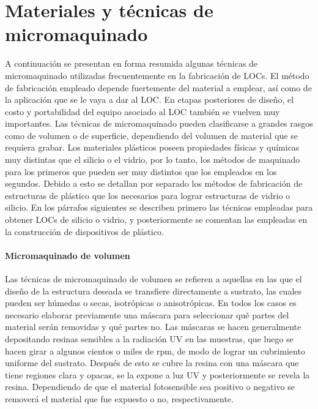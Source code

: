 \documentclass[a4paper, 12pt]{article}
\begin{document}
\section{Materiales y técnicas de micromaquinado}\label{S:mat}
A continuación se presentan en forma resumida algunas técnicas de micromaquinado utilizadas frecuentemente en la fabricación de LOCs. El método de fabricación empleado depende fuertemente del material a emplear, así como de la aplicación que se le vaya a dar al LOC. En etapas posteriores de diseño, el costo y portabilidad del equipo asociado al LOC también se vuelven muy importantes. Las técnicas de micromaquinado pueden clasificarse a grandes rasgos como de volumen o de superficie, dependiendo del volumen de material que se requiera grabar. Los materiales plásticos poseen propiedades físicas y químicas muy distintas que el silicio o el vidrio, por lo tanto, los métodos de maquinado para los primeros que pueden ser muy distintos que los empleados en los segundos. Debido a esto se detallan por separado los métodos de fabricación de estructuras de plástico que los necesarios para lograr estructuras de vidrio o silicio. En los párrafos siguientes se describen primero las técnicas empleadas para obtener LOCs de silicio o vidrio, y posteriormente se comentan las empleadas en la construcción de dispositivos de plástico.


\paragraph*{Micromaquinado de volumen}
Las técnicas de micromaquinado de volumen se refieren a a\-que\-llas en las que el diseño de la estructura deseada se transfiere directamente a sustrato, las cuales pueden ser húmedas o secas, isotrópicas o anisotrópicas. En todos los casos es necesario elaborar previamente una máscara para seleccionar qué partes del material serán removidas y qué partes no. Las máscaras se hacen generalmente depositando resinas sensibles a la radiación UV en las muestras, que luego se hacen girar a algunos cientos o miles de rpm, de modo de lograr un cubrimiento uniforme del sustrato. Después de esto se cubre la resina con una máscara que tiene regiones clara y opacas, se la expone a luz UV y posteriormente se revela la resina. Dependiendo de que el material fotosensible sea positivo o negativo se removerá el material que fue expuesto o no, respectivamente.
\end{document}
